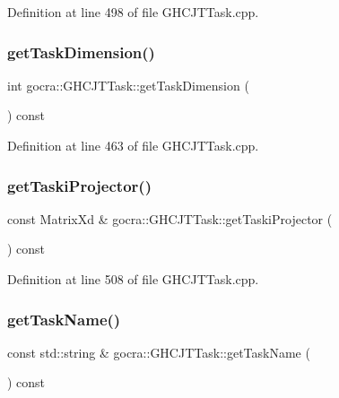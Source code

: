 Definition at line 498 of file G\+H\+C\+J\+T\+Task.\+cpp.

\hypertarget{classgocra_1_1GHCJTTask_a7c7f6781003d4ecad41e65fd417ddf48}{}\label{classgocra_1_1GHCJTTask_a7c7f6781003d4ecad41e65fd417ddf48} 
\subsubsection{\texorpdfstring{get\+Task\+Dimension()}{getTaskDimension()}}
{\footnotesize\ttfamily int gocra\+::\+G\+H\+C\+J\+T\+Task\+::get\+Task\+Dimension (\begin{DoxyParamCaption}{ }\end{DoxyParamCaption}) const}



Definition at line 463 of file G\+H\+C\+J\+T\+Task.\+cpp.

\hypertarget{classgocra_1_1GHCJTTask_afb71d62a6e57292529af427c09f92465}{}\label{classgocra_1_1GHCJTTask_afb71d62a6e57292529af427c09f92465} 
\subsubsection{\texorpdfstring{get\+Taski\+Projector()}{getTaskiProjector()}}
{\footnotesize\ttfamily const Matrix\+Xd \& gocra\+::\+G\+H\+C\+J\+T\+Task\+::get\+Taski\+Projector (\begin{DoxyParamCaption}{ }\end{DoxyParamCaption}) const}



Definition at line 508 of file G\+H\+C\+J\+T\+Task.\+cpp.

\hypertarget{classgocra_1_1GHCJTTask_ac382ad3227454bc831ce5930c7a7519a}{}\label{classgocra_1_1GHCJTTask_ac382ad3227454bc831ce5930c7a7519a} 
\subsubsection{\texorpdfstring{get\+Task\+Name()}{getTaskName()}}
{\footnotesize\ttfamily const std\+::string \& gocra\+::\+G\+H\+C\+J\+T\+Task\+::get\+Task\+Name (\begin{DoxyParamCaption}{ }\end{DoxyParamCaption}) const}



